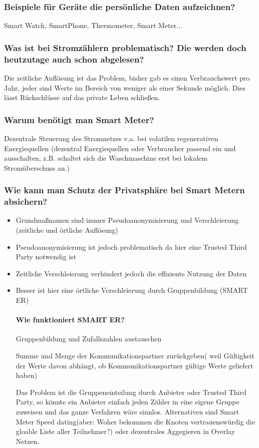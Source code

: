 	\subsubsection{Beispiele für Geräte die persönliche Daten aufzeichnen?}
	Smart Watch, SmartPhone, Thermometer, Smart Meter...
	\subsubsection{Was ist bei Stromzählern problematisch? Die werden doch heutzutage auch schon abgelesen?}
	Die zeitliche Auflösung ist das Problem, bisher gab es einen Verbrauchswert pro Jahr, jeder sind Werte im Bereich von weniger als einer Sekunde möglich. Dies lässt Rückschlüsse auf das private Leben schließen.
	\subsubsection{Warum benötigt man Smart\- Meter?}
	Dezentrale Steuerung des Stromnetzes v.a. bei volatilen regenerativen Energiequellen (dezentral Energiequellen oder Verbraucher passend ein\-  und ausschalten, z.B. schaltet sich die Waschmaschine erst bei lokalem Stromüberschuss an.)
	\subsubsection{Wie kann man Schutz der Privatsphäre bei Smart\- Metern absichern?} 
	\begin{itemize}
		\item Grundmaßnamen sind immer Pseudoanonymisierung und Verschleierung (zeitliche und örtliche Auflösung)
		\item Pseudoanonymisierung ist jedoch problematisch da hier eine Trusted Third Party notwendig ist
		\item Zeitliche Verschleierung verhindert jedoch die effiziente Nutzung der Daten
		\item Besser ist hier eine örtliche Verschleierung durch Gruppenbildung (SMART\- ER)
	\paragraph{Wie funktioniert SMART\- ER?}
	Gruppenbildung und Zufallszahlen austauschen
	
	Summe und Menge der Kommunikationspartner zurückgeben( weil Gültigkeit der Werte davon abhängt, ob Kommunikationspartner gültige Werte geliefert haben)
	
	Das Problem ist die Gruppeneinteilung durch Anbieter oder Trusted Third Party, so könnte ein Anbieter einfach jeden Zähler in eine eigene Gruppe zuweisen und das ganze Verfahren wäre sinnlos. Alternativen sind Smart Meter Speed\- dating(aber: Woher bekommen die Knoten vertrauenswürdig die gloable Liste aller Teilnehmer?) oder dezentrales Aggegieren in Overlay\- Netzen.
	\end{itemize}
	
